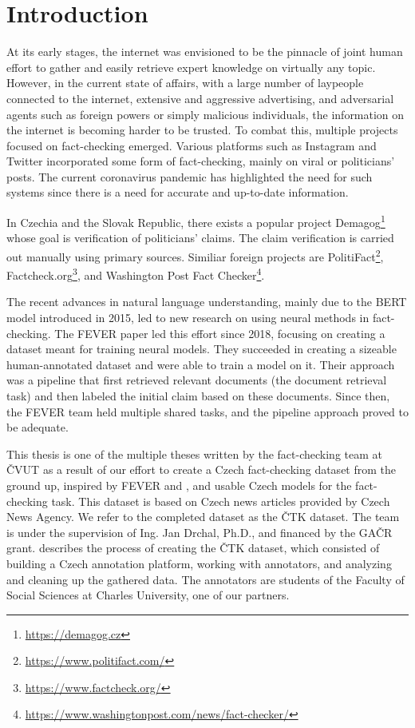 \chapter*{Introduction}

At its early stages, the internet was envisioned to be the pinnacle of joint human effort to gather and easily retrieve expert knowledge on virtually any topic.
However, in the current state of affairs, with a large number of laypeople connected to the internet, extensive and aggressive advertising, and adversarial agents such as foreign powers or simply malicious individuals, the information on the internet is becoming harder to be trusted. 
To combat this, multiple projects focused on fact-checking emerged. 
Various platforms such as Instagram and Twitter incorporated some form of fact-checking, mainly on viral or politicians' posts.
The current coronavirus pandemic has highlighted the need for such systems since there is a need for accurate and up-to-date information. 

In Czechia and the Slovak Republic, there exists a popular project Demagog\footnote{\url{https://demagog.cz}} whose goal is verification of politicians' claims.
The claim verification is carried out manually using primary sources. 
Similiar foreign projects are PolitiFact\footnote{\url{https://www.politifact.com/}}, Factcheck.org\footnote{\url{https://www.factcheck.org/}}, and Washington Post Fact Checker\footnote{\url{https://www.washingtonpost.com/news/fact-checker/}}.

The recent advances in natural language understanding, mainly due to the BERT model \citep{bert} introduced in 2015, led to new research on using neural methods in fact-checking.
The FEVER paper \citep{fever} led this effort since 2018, focusing on creating a dataset meant for training neural models.
They succeeded in creating a sizeable human-annotated dataset and were able to train a model on it.
Their approach was a pipeline that first retrieved relevant documents (the document retrieval task) and then labeled the initial claim based on these documents. 
Since then, the FEVER team held multiple shared tasks, and the pipeline approach proved to be adequate.

This thesis is one of the multiple theses written by the fact-checking team at ČVUT as a result of our effort to create a Czech fact-checking dataset from the ground up, inspired by FEVER and \citet{danish_fever}, and usable Czech models for the fact-checking task.
This dataset is based on Czech news articles provided by Czech News Agency.
We refer to the completed dataset as the ČTK dataset. 
The team is under the supervision of Ing. Jan Drchal, Ph.D., and financed by the GAČR grant.
\citet{ullrich} describes the process of creating the ČTK dataset, which consisted of building a Czech annotation platform, working with annotators, and analyzing and cleaning up the gathered data.
The annotators are students of the Faculty of Social Sciences at Charles University, one of our partners.

